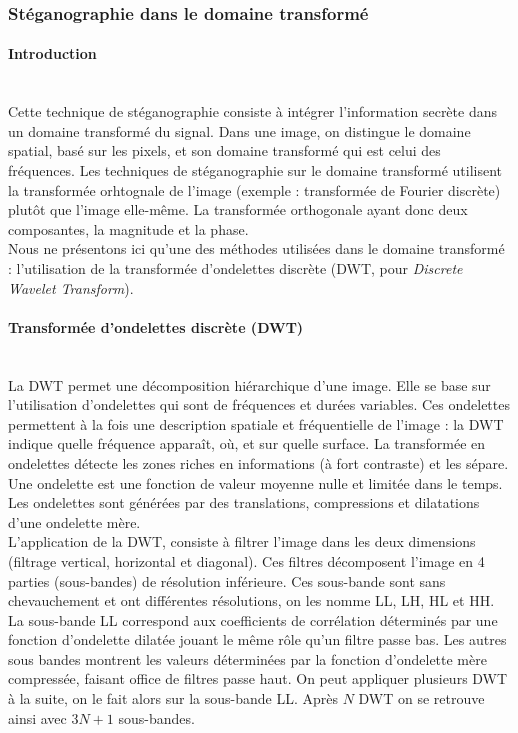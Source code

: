 \subsubsection{Stéganographie dans le domaine transformé\cite{DWT-DCT,Ondelettes}}

\paragraph{Introduction}~\\\indent
Cette technique de stéganographie consiste à intégrer l'information secrète dans un domaine transformé du signal. Dans une image, on distingue le domaine spatial, basé sur les pixels, et son domaine transformé qui est celui des fréquences. Les techniques de stéganographie sur le domaine transformé utilisent la transformée orhtognale de l'image (exemple : transformée de Fourier discrète) plutôt que l'image elle-même. La transformée orthogonale ayant donc deux composantes, la magnitude et la phase.\\

Nous ne présentons ici qu'une des méthodes utilisées dans le domaine transformé : l'utilisation de la transformée d'ondelettes discrète (DWT, pour \emph{Discrete Wavelet Transform}).

\paragraph{Transformée d'ondelettes discrète (DWT)}~\\\indent
La DWT permet une décomposition hiérarchique d'une image. Elle se base sur l'utilisation d'ondelettes qui sont de fréquences et durées variables. Ces ondelettes permettent à la fois une description spatiale et fréquentielle de l'image : la DWT indique quelle fréquence apparaît, où, et sur quelle surface. La transformée en ondelettes détecte les zones riches en informations (à fort contraste) et les sépare. Une ondelette est une fonction de valeur moyenne nulle et limitée dans le temps. Les ondelettes sont générées par des translations, compressions et dilatations d'une ondelette mère. \\

L'application de la DWT, consiste à filtrer l'image dans les deux dimensions (filtrage vertical, horizontal et diagonal). Ces filtres décomposent l'image en 4 parties (sous-bandes) de résolution inférieure. Ces sous-bande sont sans chevauchement et ont différentes résolutions, on les nomme LL, LH, HL et HH. La sous-bande LL correspond aux coefficients de corrélation déterminés par une fonction d'ondelette dilatée jouant le même rôle qu'un filtre passe bas. Les autres sous bandes montrent les valeurs déterminées par la fonction d'ondelette mère compressée, faisant office de filtres passe haut. On peut appliquer plusieurs DWT à la suite, on le fait alors sur la sous-bande LL. Après $N$ DWT on se retrouve ainsi avec $3N+1$ sous-bandes.\\

